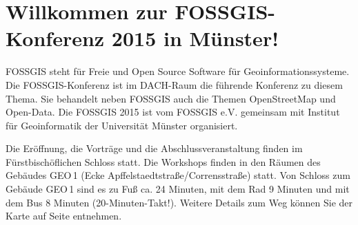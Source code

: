 \newpage
\section*{Willkommen zur FOSSGIS-Konferenz 2015 in Münster!} \label{welcome}
FOSSGIS steht für Freie und Open Source Software für Geoinformationssysteme. 
Die FOSSGIS-Konferenz ist im DACH-Raum die führende Konferenz zu diesem Thema. Sie behandelt neben
FOSSGIS auch die Themen OpenStreetMap und Open-Data.
Die FOSSGIS 2015 ist vom FOSSGIS e.V. gemeinsam mit Institut für Geoinformatik der 
Universität Münster organisiert.

Die Eröffnung, die Vorträge und die Abschlussveranstaltung finden im Fürstbischöflichen Schloss statt. 
Die Workshops finden in den Räumen des Gebäudes GEO\,1 (Ecke Apffelstaedtstraße/Corrensstraße) statt. Von Schloss 
zum Gebäude GEO\,1 sind es zu Fuß ca. 24 Minuten, mit dem Rad 9 Minuten und mit dem Bus 8 Minuten (20-Minuten-Takt!).
Weitere Details zum Weg können Sie der Karte auf Seite \pageref{karte} entnehmen.

\newpage
